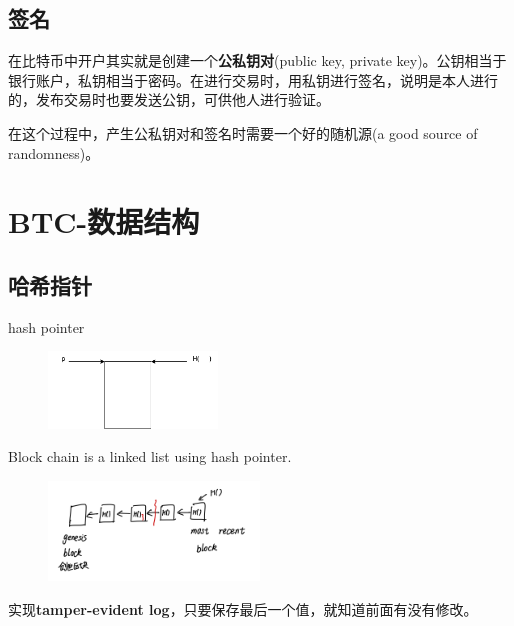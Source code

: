 \documentclass[10pt]{ctexart}
\begin{document}
\subsection{签名}
在比特币中开户其实就是创建一个\textbf{公私钥对}(public key, private key)。公钥相当于银行账户，私钥相当于密码。在进行交易时，用私钥进行签名，说明是本人进行的，发布交易时也要发送公钥，可供他人进行验证。

在这个过程中，产生公私钥对和签名时需要一个好的随机源(a good source of randomness)。
\section{BTC-数据结构}
\subsection{哈希指针}
hash pointer
\begin{figure}[H]
    \centering
    \includegraphics[width=0.4\textwidth]{./lecture3/img1.png} 
\end{figure}
Block chain is a linked list using hash pointer.
\begin{figure}[H]
    \centering
    \includegraphics[width=0.5\textwidth]{./lecture3/img2.png} 
\end{figure}

实现\textbf{tamper-evident log}，只要保存最后一个值，就知道前面有没有修改。
\end{document}
